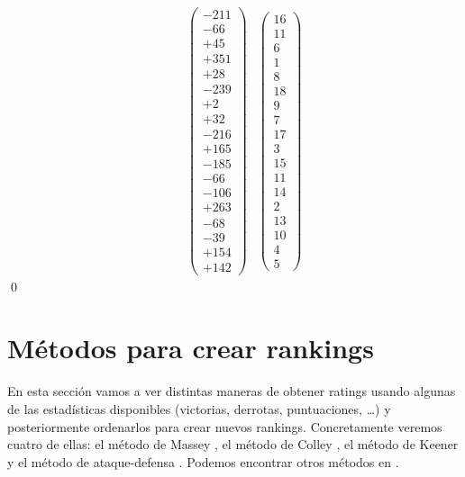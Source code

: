 \[\begin{array}{ccc}
\begin{array}{c}
	\end{array} & \left(\begin{array}{c}
	-211\\
	-66\\
	+45\\
	+351\\
	+28\\
	-239\\
	+2\\
	+32\\
	-216\\
	+165\\
	-185\\
	-66\\
	-106\\
	+263\\
	-68\\
	-39\\
	+154\\
	+142
	\end{array} \right) & \left(\begin{array}{c}
	16\\
	11\\
	6\\
	1\\
	8\\
	18\\
	9\\
	7\\
	17\\
	3\\
	15\\
	11\\
	14\\
	2\\
	13\\
	10\\
	4\\
	5
	\end{array} \right) 
	\end{array}  
	\]
\qed
\section{Métodos para crear rankings}
En esta sección vamos a ver distintas maneras de obtener ratings usando algunas de las estadísticas disponibles (victorias, derrotas, puntuaciones, \dots) y posteriormente ordenarlos para crear nuevos rankings. Concretamente veremos cuatro de ellas: el método de Massey \cite{cap2}, el método de Colley \cite{cap3}, el método de Keener \cite{cap4} y el método de ataque-defensa \cite{cap7}. Podemos encontrar otros métodos en \cite{otros_met}.

